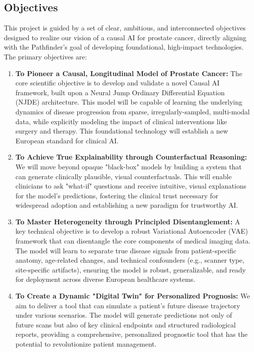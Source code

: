 \documentclass[11pt, a4paper]{article}
\begin{document}
\subsection{Objectives}
This project is guided by a set of clear, ambitious, and interconnected objectives designed to realize our vision of a causal AI for prostate cancer, directly aligning with the Pathfinder's goal of developing foundational, high-impact technologies. The primary objectives are:
\begin{enumerate}
    \item \textbf{To Pioneer a Causal, Longitudinal Model of Prostate Cancer:} The core scientific objective is to develop and validate a novel Causal AI framework, built upon a Neural Jump Ordinary Differential Equation (NJDE) architecture. This model will be capable of learning the underlying dynamics of disease progression from sparse, irregularly-sampled, multi-modal data, while explicitly modeling the impact of clinical interventions like surgery and therapy. This foundational technology will establish a new European standard for clinical AI.

    \item \textbf{To Achieve True Explainability through Counterfactual Reasoning:} We will move beyond opaque "black-box" models by building a system that can generate clinically plausible, visual counterfactuals. This will enable clinicians to ask "what-if" questions and receive intuitive, visual explanations for the model's predictions, fostering the clinical trust necessary for widespread adoption and establishing a new paradigm for trustworthy AI.

    \item \textbf{To Master Heterogeneity through Principled Disentanglement:} A key technical objective is to develop a robust Variational Autoencoder (VAE) framework that can disentangle the core components of medical imaging data. The model will learn to separate true disease signals from patient-specific anatomy, age-related changes, and technical confounders (e.g., scanner type, site-specific artifacts), ensuring the model is robust, generalizable, and ready for deployment across diverse European healthcare systems.

    \item \textbf{To Create a Dynamic "Digital Twin" for Personalized Prognosis:} We aim to deliver a tool that can simulate a patient's future disease trajectory under various scenarios. The model will generate predictions not only of future scans but also of key clinical endpoints and structured radiological reports, providing a comprehensive, personalized prognostic tool that has the potential to revolutionize patient management.


\end{enumerate}
\end{document}
